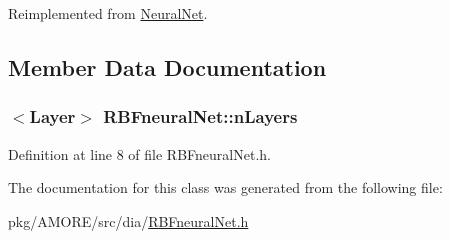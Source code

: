 Reimplemented from \hyperlink{class_neural_net_a3088aef3aa1fa865621a9609b12c948c}{NeuralNet}.



\subsection{Member Data Documentation}
\hypertarget{class_r_b_fneural_net_a35e22224d756a7a8137269927ac2ce3f}{
\subsubsection[{nLayers}]{$<${\bf Layer}$>$ {\bf RBFneuralNet::nLayers}}}
\label{class_r_b_fneural_net_a35e22224d756a7a8137269927ac2ce3f}


Definition at line 8 of file RBFneuralNet.h.



The documentation for this class was generated from the following file:\begin{DoxyCompactItemize}
\item 
pkg/AMORE/src/dia/\hyperlink{dia_2_r_b_fneural_net_8h}{RBFneuralNet.h}\end{DoxyCompactItemize}

